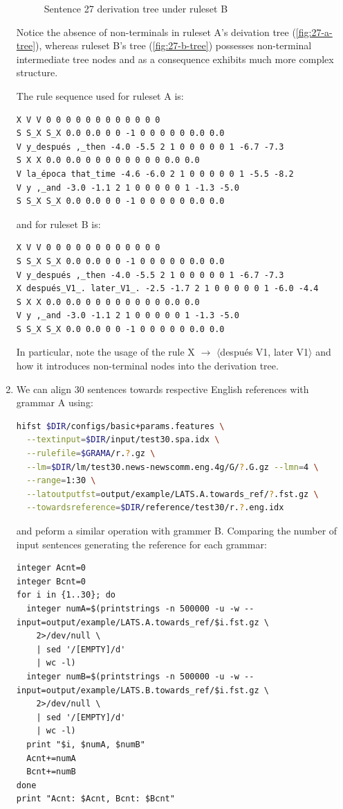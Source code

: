 \documentclass[a4paper,oneside,reqno]{amsart}
\begin{document}
\begin{enumerate}[label=\arabic*.]
\begin{figure}[h!]
\begin{center}
      \end{center}
      \caption{Sentence 27 derivation tree under ruleset B}
      \label{fig:27-b-tree}
    \end{figure}
    Notice the absence of non-terminals in ruleset A's
    deivation tree (\autoref{fig:27-a-tree}), whereas ruleset B's
    tree (\autoref{fig:27-b-tree}) possesses non-terminal intermediate tree
    nodes and as a consequence exhibits much more complex structure.

    The rule sequence used for ruleset A is:
    \begin{verbatim}
X V V 0 0 0 0 0 0 0 0 0 0 0 0
S S_X S_X 0.0 0.0 0 0 -1 0 0 0 0 0 0.0 0.0
V y_después ,_then -4.0 -5.5 2 1 0 0 0 0 0 1 -6.7 -7.3
S X X 0.0 0.0 0 0 0 0 0 0 0 0 0.0 0.0
V la_época that_time -4.6 -6.0 2 1 0 0 0 0 0 1 -5.5 -8.2
V y ,_and -3.0 -1.1 2 1 0 0 0 0 0 1 -1.3 -5.0
S S_X S_X 0.0 0.0 0 0 -1 0 0 0 0 0 0.0 0.0
    \end{verbatim}
    and for ruleset B is:
    \begin{verbatim}
X V V 0 0 0 0 0 0 0 0 0 0 0 0
S S_X S_X 0.0 0.0 0 0 -1 0 0 0 0 0 0.0 0.0
V y_después ,_then -4.0 -5.5 2 1 0 0 0 0 0 1 -6.7 -7.3
X después_V1_. later_V1_. -2.5 -1.7 2 1 0 0 0 0 0 1 -6.0 -4.4
S X X 0.0 0.0 0 0 0 0 0 0 0 0 0.0 0.0
V y ,_and -3.0 -1.1 2 1 0 0 0 0 0 1 -1.3 -5.0
S S_X S_X 0.0 0.0 0 0 -1 0 0 0 0 0 0.0 0.0
    \end{verbatim}
    In particular, note the usage of the rule X $\to$ $\langle$después V1,
    later V1$\rangle$ and how it introduces non-terminal nodes into
    the derivation tree.

  \item We can align 30 sentences towards respective English references
    with grammar A using:
    \begin{lstlisting}[language=bash]
hifst $DIR/configs/basic+params.features \
  --textinput=$DIR/input/test30.spa.idx \
  --rulefile=$GRAMA/r.?.gz \
  --lm=$DIR/lm/test30.news-newscomm.eng.4g/G/?.G.gz --lmn=4 \
  --range=1:30 \
  --latoutputfst=output/example/LATS.A.towards_ref/?.fst.gz \
  --towardsreference=$DIR/reference/test30/r.?.eng.idx
    \end{lstlisting}
    and peform a similar operation with grammer B.
    Comparing the number of input sentences generating the reference for each
    grammar:

    \begin{lstlisting}
integer Acnt=0
integer Bcnt=0
for i in {1..30}; do
  integer numA=$(printstrings -n 500000 -u -w --input=output/example/LATS.A.towards_ref/$i.fst.gz \
    2>/dev/null \
    | sed '/[EMPTY]/d'
    | wc -l)
  integer numB=$(printstrings -n 500000 -u -w --input=output/example/LATS.B.towards_ref/$i.fst.gz \
    2>/dev/null \
    | sed '/[EMPTY]/d'
    | wc -l)
  print "$i, $numA, $numB"
  Acnt+=numA
  Bcnt+=numB
done
print "Acnt: $Acnt, Bcnt: $Bcnt"
    \end{lstlisting}


\end{enumerate}
\end{document}
